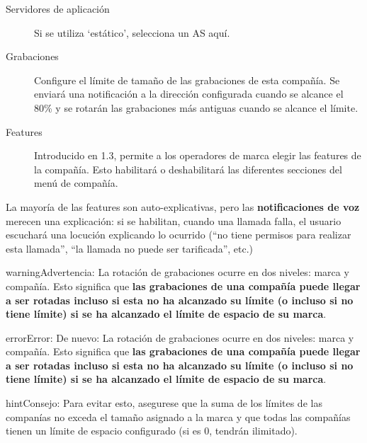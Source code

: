\documentclass[letterpaper,10pt,spanish]{sphinxmanual}
\begin{document}
\begin{description}
\item[{Servidores de aplicación}] \leavevmode{}\label{internal_calls/brand_portal:term-application-server}
Si se utiliza `estático', selecciona un AS aquí.

\item[{Grabaciones}] \leavevmode{}\label{internal_calls/brand_portal:term-recordings}
Configure el límite de tamaño de las grabaciones de esta compañía. Se enviará una notificación a la dirección configurada cuando se alcance el 80\% y se rotarán las grabaciones más antiguas cuando se alcance el límite.

\item[{Features}] \leavevmode{}\label{internal_calls/brand_portal:term-features}
Introducido en 1.3, permite a los operadores de marca elegir las features de la compañía. Esto habilitará o deshabilitará las diferentes secciones del menú de compañía.

\end{description}

La mayoría de las features son auto-explicativas, pero las \textbf{notificaciones de voz} merecen una explicación: si se habilitan, cuando una llamada falla, el usuario escuchará una locución explicando lo ocurrido (``no tiene permisos para realizar esta llamada'', ``la llamada no puede ser tarificada'', etc.)

\begin{notice}{warning}{Advertencia:}
La rotación de grabaciones ocurre en dos niveles: marca y compañía. Esto significa que \textbf{las grabaciones de una compañía puede llegar a ser rotadas incluso si esta no ha alcanzado su límite (o incluso si no tiene límite) si se ha alcanzado el límite de espacio de su marca}.
\end{notice}

\begin{notice}{error}{Error:}
De nuevo: La rotación de grabaciones ocurre en dos niveles: marca y compañía. Esto significa que \textbf{las grabaciones de una compañía puede llegar a ser rotadas incluso si esta no ha alcanzado su límite (o incluso si no tiene límite) si se ha alcanzado el límite de espacio de su marca}.
\end{notice}

\begin{notice}{hint}{Consejo:}
Para evitar esto, asegurese que la suma de los límites de las companías no exceda el tamaño asignado a la marca y que todas las compañías tienen un límite de espacio configurado (si es 0, tendrán ilimitado).
\end{notice}
\end{document}
